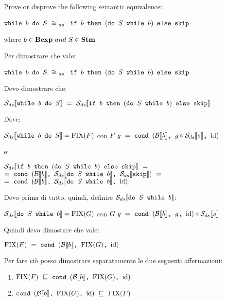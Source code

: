 \newcommand{\dSwb}[2]
{
    \mbox{\normalfont{\texttt{do }}}
    #1
    \textrm{\normalfont{\texttt{ while }}}
    #2
}
\newcommand{\exTen}
{
	$ \wbS{b}{S} ~\cong{}_{ds}~$
	{$\ifABC{b}{(\dSwb{S}{b})}{\skipistr}$}
}

{
	Prove or disprove the following semantic equivalence:
	\begin{center}
		\exTen{}
	\end{center}
	where $b\in\bexp~and~S\in\stm$
}
{
    Per dimostrare che vale:
    \begin{center}
    \exTen{}
    \end{center}
    Devo dimostrare che:
    \begin{center}
    $\dsCtxt{\wbS{b}{S}}~=~
    \dsCtxt{\ifABC{b}{(\dSwb{S}{b})}{\skipistr}}$
    \end{center}
    Dove:
    \begin{center}
    $\dsCtxt{\wbS{b}{S}}=\fixp{F}$ con 
    $F~g~=~\cond{b}{g \circ{} \Sds{}}{\idDS}$ \\
    \end{center}
    e:
    \begin{center}
    $\dsCtxt{\ifABC{b}{(\dSwb{S}{b})}{\skipistr}}~=$\\$=~
    \cond{b}{\dsCtxt{\dSwb{S}{b}}}{\dsCtxt{\skipistr}}~=$\\$=~
    \cond{b}{\dsCtxt{\dSwb{S}{b}}}{\idDS}$
    \end{center}
    Devo prima di tutto, quindi, definire $\dsCtxt{\dSwb{S}{b}}$:
    \begin{center}
    $\dsCtxt{\dSwb{S}{b}}=\fixp{G}$ con 
    $G~g~=~\cond{b}{g}{\idDS} \circ \Sds$
    \end{center}
    Quindi devo dimostare che vale:
    \begin{center}
    $\fixp{F}~=~\cond{b}{\fixp{G}}{\idDS}$
    \end{center}
    Per fare ciò posso dimostrare separatamente le due seguenti affermazioni:
    \begin{enumerate}
    \item $\fixp{F}~\mineq~\cond{b}{\fixp{G}}{\idDS}$
    \item $\cond{b}{\fixp{G}}{\idDS}~\mineq~\fixp{F}$
    \end{enumerate}

}
